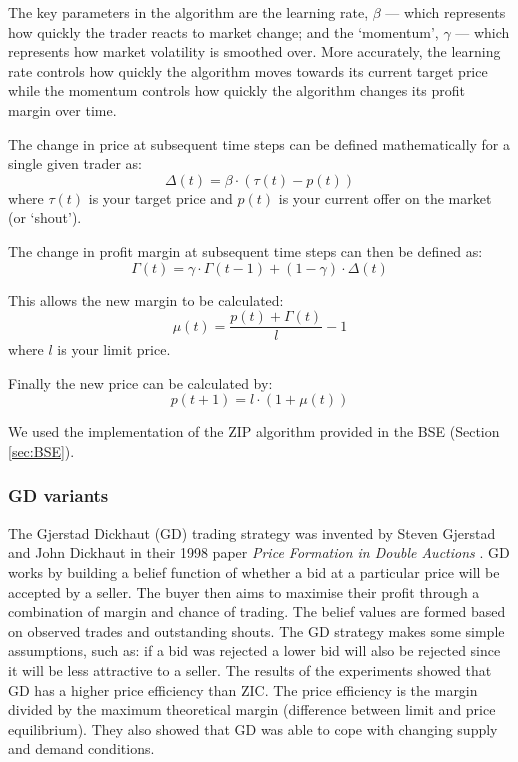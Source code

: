 \documentclass[preprint]{acm_proc_article-sp} %
\begin{document}
The key parameters in the algorithm are the learning rate, $\beta$ --- which represents how quickly 
the trader reacts to market change; and the `momentum', $\gamma$ --- which represents how market 
volatility is smoothed over. More accurately, the learning rate controls how quickly the algorithm 
moves towards its current target price while the momentum controls how quickly the algorithm changes 
its profit margin over time.

The change in price at subsequent time steps can be defined mathematically for a single given trader as:
\begin{equation}
    \Delta(t) = \beta \cdot ( \tau(t) - p(t))
    \label{eqn:change_in_price}
\end{equation}
where $\tau(t)$ is your target price and $p(t)$ is your current offer on the market (or `shout').

The change in profit margin at subsequent time steps can then be defined as:
\begin{equation}
    \Gamma(t) = \gamma \cdot \Gamma(t-1) + (1 - \gamma) \cdot \Delta(t)
    \label{eqn:change_in_margin}
\end{equation}

This allows the new margin to be calculated:
\begin{equation}
    \mu(t) = \frac{p(t) + \Gamma(t)}{l} - 1
    \label{eqn:new_margin}
\end{equation}
where $l$ is your limit price.

Finally the new price can be calculated by:
\begin{equation}
    p(t+1) = l \cdot (1 + \mu(t))
    \label{eqn:new_price}
\end{equation}

We used the implementation of the ZIP algorithm provided in the BSE (Section \ref{sec:BSE}).\\



\subsubsection{GD variants} \label{sec:traders_GDV}

The Gjerstad Dickhaut (GD) trading strategy was invented by Steven Gjerstad and John Dickhaut in 
their 1998 paper \emph{Price Formation in Double Auctions} \cite{gd}.
GD works by building a belief function of whether a bid at a particular price
will be accepted by a seller.
The buyer then aims to maximise their profit through a combination of margin
and chance of trading.
The belief values are formed based on observed trades and outstanding shouts.
The GD strategy makes some simple assumptions, such as: if a bid was rejected a
lower bid will also be rejected since it will be less attractive to a seller.
The results of the experiments showed that GD has a higher price efficiency than ZIC.
The price efficiency is the margin divided by the maximum theoretical margin
(difference between limit and price equilibrium).
They also showed that GD was able to cope with changing supply and demand
conditions.
\end{document}
